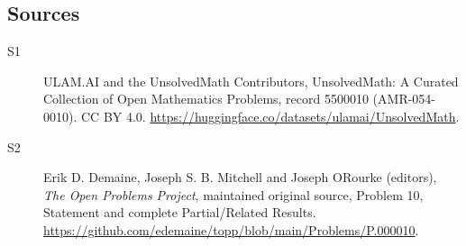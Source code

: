 \documentclass[11pt]{article}
\begin{document}
\subsection{Sources}
\begin{description}
\item[\hypertarget{source:5500010:1}{S1}] ULAM.AI and the UnsolvedMath Contributors, UnsolvedMath: A Curated Collection of Open Mathematics Problems, record 5500010 (AMR-054-0010). CC BY 4.0. \url{https://huggingface.co/datasets/ulamai/UnsolvedMath}.
\item[\hypertarget{source:5500010:2}{S2}] Erik D. Demaine, Joseph S. B. Mitchell and Joseph O\textquotesingle Rourke (editors), \emph{The Open Problems Project}, maintained original source, Problem 10, Statement and complete Partial/Related Results. \url{https://github.com/edemaine/topp/blob/main/Problems/P.000010}.
\end{description}
\label{end:5500010}
\end{document}
